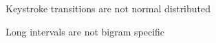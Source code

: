 \begin{frame}{Keystroke transitions are not normal distributed}
	\begin{center}
	
	\end{center}
	
\end{frame}

\begin{frame}{Long intervals are not bigram specific}

	\begin{center}
	\end{center}

\end{frame}
